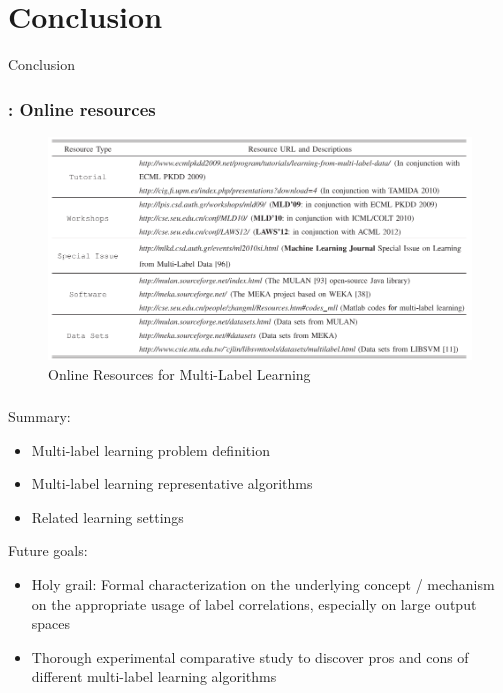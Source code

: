 \documentclass{beamer}
\begin{document}
\section{Conclusion}
\begin{frame}
\Huge{\centerline{Conclusion}}
\end{frame}
\begin{frame}
\frametitle{\insertsection : Online resources}
\begin{figure}
\begin{center}
\includegraphics[scale = 0.47]{images/online.png}
\caption{Online Resources for Multi-Label Learning}
\end{center}
\end{figure}
\end{frame}
\begin{frame}
\frametitle{\insertsection}
Summary:
\begin{itemize}
\item Multi-label learning problem definition
\item Multi-label learning representative algorithms
\item Related learning settings
\end{itemize}

Future goals:
\begin{itemize}
\item Holy grail: Formal characterization on the underlying concept / mechanism on the appropriate usage of label correlations, especially on large output spaces
\item Thorough experimental comparative study to discover pros and cons of different multi-label learning algorithms
\end{itemize}
\end{frame}
\end{document}
